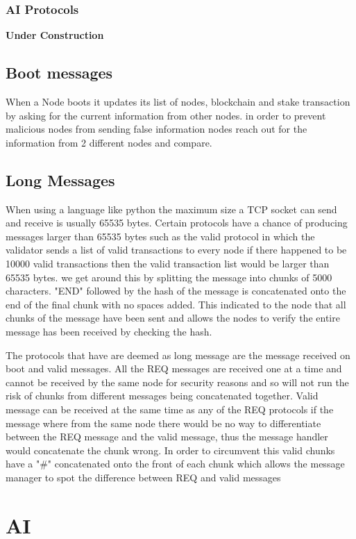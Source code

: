 \documentclass[11pt]{article}
\begin{document}
\subsubsection*{AI Protocols}
\textbf{Under Construction}

\subsection{Boot messages}
When a Node boots it updates its list of nodes, blockchain and stake transaction by asking for the current information from other nodes. in order to prevent malicious nodes from sending false information nodes reach out for the information from 2 different nodes and compare. 

\subsection{Long Messages}
When using a language like python the maximum size a TCP socket can send and receive is usually 65535 bytes. Certain protocols have a chance of producing messages larger than 65535 bytes such as the valid protocol in which the validator sends a list of valid transactions to every node if there happened to be 10000 valid transactions then the valid transaction list would be larger than 65535 bytes. we get around this by splitting the message into chunks of 5000 characters. "END" followed by the hash of the message is concatenated onto the end of the final chunk with no spaces added. This indicated to the node that all chunks of the message have been sent and allows the nodes to verify the entire message has been received by checking the hash. 

The protocols that have are deemed as long message are the message received on boot and valid messages. All the REQ messages are received one at a time and cannot be received by the same node for security reasons and so will not run the risk of chunks from different messages being concatenated together. Valid message can be received at the same time as any of the REQ protocols if the message where from the same node there would be no way to differentiate between the REQ message and the valid message, thus the message handler would concatenate the chunk wrong. In order to circumvent this valid chunks have a "\#" concatenated onto the front of each chunk which allows the message manager to spot the difference between REQ and valid messages


\section{AI}
\end{document}
